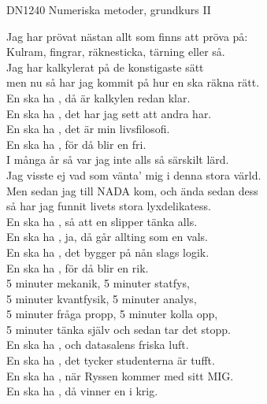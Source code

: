 \documentclass[a6paper,10pt]{article}
\begin{document}
\setlength{\oddsidemargin}{-0.47in}
\noindent
\begin{center}
\footnotesize DN1240 Numeriska metoder, grundkurs II\\
\end{center}
\begin{lyrics}
Jag har prövat nästan allt som finns att pröva på:\\
Kulram, fingrar, räknesticka, tärning eller så.\\
Jag har kalkylerat på de konstigaste sätt\\
men nu så har jag kommit på hur en ska räkna rätt.
\vspace{5pt} \\
En ska ha , då är kalkylen redan klar.\\
En ska ha , det har jag sett att andra har.\\
En ska ha , det är min livsfilosofi.\\
En ska ha , för då blir en fri.
\vspace{5pt} \\
I många år så var jag inte alls så särskilt lärd.\\
Jag visste ej vad som vänta’ mig i denna stora värld.\\
Men sedan jag till NADA kom, och ända sedan dess\\
så har jag funnit livets stora lyxdelikatess.
\vspace{5pt} \\
En ska ha , så att en slipper tänka alls.\\
En ska ha , ja, då går allting som en vals.\\
En ska ha , det bygger på nån slags logik.\\
En ska ha , för då blir en rik.
\vspace{5pt} \\
5 minuter mekanik, 5 minuter statfys,\\
5 minuter kvantfysik, 5 minuter analys,\\
5 minuter fråga propp, 5 minuter kolla opp,\\
5 minuter tänka själv och sedan tar det stopp.
\vspace{5pt} \\
En ska ha , och datasalens friska luft.\\
En ska ha , det tycker studenterna är tufft.\\
En ska ha , när Ryssen kommer med sitt MIG.\\
En ska ha , då vinner en i krig.
\end{lyrics}
\end{document}

